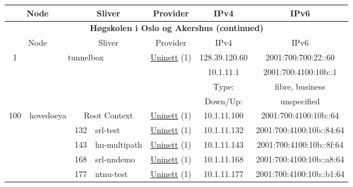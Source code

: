 \begin{small}
\begin{center}
\begin{longtable}{|c|c|c|c|c|c|c|c|}
 \multicolumn{2}{|p{8em}|}{Node} & \multicolumn{2}{|p{8em}|}{Sliver} & \multicolumn{2}{|p{8em}|}{Provider} & IPv4 & IPv6 \\ \hline
\endfirsthead
\hline
 \multicolumn{8}{|c|}{\textbf{Høgskolen i Oslo og Akershus (continued)}} \\ \hline
 \multicolumn{2}{|p{8em}|}{Node} & \multicolumn{2}{|p{8em}|}{Sliver} & \multicolumn{2}{|p{8em}|}{Provider} & IPv4 & IPv6 \\ \hline
\endhead
 \multirow{4}{*}{\tiny{1}} & \multicolumn{3}{|c|}{\multirow{4}{*}{\tiny{tunnelbox}}} & \multicolumn{2}{|c|}{\multirow{4}{*}{\tiny{\href{https://www.uninett.no}{Uninett} (1)}}} & \tiny{128.39.120.60} & \tiny{2001:700:700:22::60} \\* \cline{7-7}\cline{8-8}
  & \multicolumn{3}{|c|}{} & \multicolumn{2}{|c|}{} & \tiny{10.1.11.1} & \tiny{2001:700:4100:10b::1} \\* \cline{7-7}\cline{8-8}
  & \multicolumn{3}{|c|}{} & \multicolumn{2}{|c|}{} & Type: & fibre, business \\* \cline{7-7}\cline{8-8}
  & \multicolumn{3}{|c|}{} & \multicolumn{2}{|c|}{} & Down/Up:  & unspecified \\ \hline
 \multirow{5}{*}{\tiny{100}} & \multicolumn{1}{|l|}{\multirow{5}{*}{\tiny{hovedoeya}}} & \multicolumn{2}{|c|}{\tiny{Root Context}} & \multicolumn{2}{|c|}{\tiny{\href{https://www.uninett.no}{Uninett} (1)}} & \tiny{10.1.11.100} & \tiny{2001:700:4100:10b::64} \\* \cline{3-3}\cline{4-4}\cline{5-5}\cline{6-6}\cline{7-7}\cline{8-8}
  &  & \tiny{132} & \multicolumn{1}{|l|}{\tiny{srl-test}} & \multicolumn{2}{|c|}{\tiny{\href{https://www.uninett.no}{Uninett} (1)}} & \tiny{10.1.11.132} & \tiny{2001:700:4100:10b::84:64} \\* \cline{3-3}\cline{4-4}\cline{5-5}\cline{6-6}\cline{7-7}\cline{8-8}
  &  & \tiny{143} & \multicolumn{1}{|l|}{\tiny{hu-multipath}} & \multicolumn{2}{|c|}{\tiny{\href{https://www.uninett.no}{Uninett} (1)}} & \tiny{10.1.11.143} & \tiny{2001:700:4100:10b::8f:64} \\* \cline{3-3}\cline{4-4}\cline{5-5}\cline{6-6}\cline{7-7}\cline{8-8}
  &  & \tiny{168} & \multicolumn{1}{|l|}{\tiny{srl-nndemo}} & \multicolumn{2}{|c|}{\tiny{\href{https://www.uninett.no}{Uninett} (1)}} & \tiny{10.1.11.168} & \tiny{2001:700:4100:10b::a8:64} \\* \cline{3-3}\cline{4-4}\cline{5-5}\cline{6-6}\cline{7-7}\cline{8-8}
  &  & \tiny{177} & \multicolumn{1}{|l|}{\tiny{ntnu-test}} & \multicolumn{2}{|c|}{\tiny{\href{https://www.uninett.no}{Uninett} (1)}} & \tiny{10.1.11.177} & \tiny{2001:700:4100:10b::b1:64} \\ \hline

\end{longtable}
\end{center}
\end{small}
